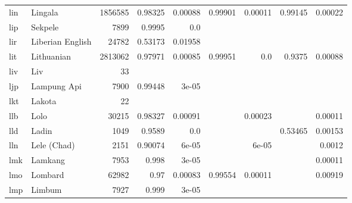 \documentclass[11pt]{article}
\begin{document}
\begin{table*}[h]
{\begin{tabular}{llrrrrrrr}
lin         & Lingala         & 1856585         & 0.98325         & 0.00088         & 0.99901         & 0.00011         & 0.99145         & 0.00022         \\

lip         & Sekpele         & 7899         & 0.9995         & 0.0         &          &          &          &          \\

lir         & Liberian English         & 24782         & 0.53173         & 0.01958         &          &          &          &          \\

lit         & Lithuanian         & 2813062         & 0.97971         & 0.00085         & 0.99951         & 0.0         & 0.9375         & 0.00088         \\

liv         & Liv         & 33         &          &          &          &          &          &          \\

ljp         & Lampung Api         & 7900         & 0.99448         & 3e-05         &          &          &          &          \\

lkt         & Lakota         & 22         &          &          &          &          &          &          \\

llb         & Lolo         & 30215         & 0.98327         & 0.00091         &          & 0.00023         &          & 0.00011         \\

lld         & Ladin         & 1049         & 0.9589         & 0.0         &          &          & 0.53465         & 0.00153         \\

lln         & Lele (Chad)         & 2151         & 0.90074         & 6e-05         &          & 6e-05         &          & 0.0012         \\

lmk         & Lamkang         & 7953         & 0.998         & 3e-05         &          &          &          & 0.00011         \\

lmo         & Lombard         & 62982         & 0.97         & 0.00083         & 0.99554         & 0.00011         &          & 0.00919         \\

lmp         & Limbum         & 7927         & 0.999         & 3e-05         &          &          &          &          \\


\end{tabular}}
\end{table*}
\end{document}
